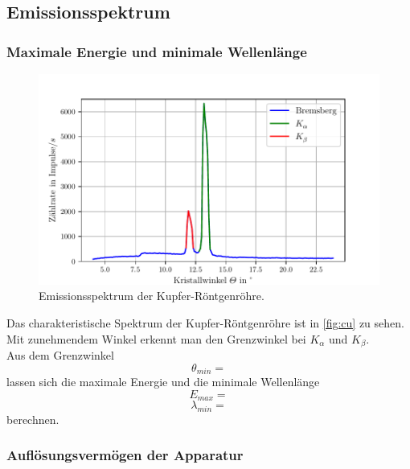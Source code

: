 \subsection{Emissionsspektrum}
\label{subsec:emissionsspektrum}


\subsubsection*{Maximale Energie und minimale Wellenlänge}

\begin{figure}
  \centering
  \includegraphics{build/plot_cu.pdf}
  \caption{Emissionsspektrum der Kupfer-Röntgenröhre.}
  \label{fig:cu}
\end{figure}


Das charakteristische Spektrum der Kupfer-Röntgenröhre ist in \autoref{fig:cu} zu sehen.\\
Mit zunehmendem Winkel erkennt man den Grenzwinkel bei  $K_{\alpha}$ und $K_{\beta}$. \\ 
Aus dem Grenzwinkel \begin{equation*}
  \theta_{min} = 
\end{equation*}
lassen sich die maximale Energie und die minimale Wellenlänge 
\begin{equation*}
  E_{max} = 
\end{equation*}
\begin{equation*}
  \lambda_{min} =
\end{equation*} 
berechnen.


\subsubsection*{Auflösungsvermögen der Apparatur}

